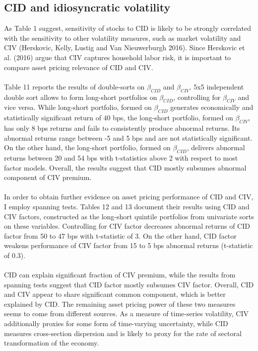 \documentclass[12pt]{article}
\begin{document}
\subsection{CID and idiosyncratic volatility}
As Table 1 suggest, sensitivity of stocks to CID is likely to be strongly correlated with the sensitivity to other volatility measures, such as market volatility and CIV (Herskovic, Kelly, Lustig and Van Nieuwerburgh 2016). Since Herskovic et al. (2016) argue that CIV captures household labor risk, it is important to compare asset pricing relevance of CID and CIV. 
\paragraph{}
Table 11 reports the results of double-sorts on $\beta_{CID}$ and $\beta_{CIV}$. 5x5 independent double sort allows to form long-short portfolios on $\beta_{CID}$, controlling for $\beta_{CIV}$ and vice versa. While long-short portfolio, formed on $\beta_{CID}$ generates economically and statistically significant return of 40 bps, the long-short portfolio, formed on $\beta_{CIV}$, has only 8 bps returns and fails to consistently produce abnormal returns. Its abnormal returns range between -5 and 5 bps and are not statistically significant. On the other hand, the long-short portfolio, formed on $\beta_{CID}$, delivers abnormal returns between 20 and 54 bps with t-statistics above 2 with respect to most factor models. Overall, the results suggest that CID mostly subsumes abnormal component of CIV premium.
\paragraph{}
In order to obtain further evidence on asset pricing performance of CID and CIV, I employ spanning tests. Tables 12 and 13 document their results using CID and CIV factors, constructed as the long-short quintile portfolios from univariate sorts on these variables. Controlling for CIV factor decreases abnormal returns of CID factor from 50 to 47 bps with t-statistic of 3. On the other hand, CID factor weakens performance of CIV factor from 15 to 5 bps abnormal returns (t-statistic of 0.3). 

\paragraph{}
CID can explain significant fraction of CIV premium, while the results from spanning tests suggest that CID factor mostly subsumes CIV factor. Overall, CID and CIV appear to share significant common component, which is better explained by CID. The remaining asset pricing power of these two measures seems to come from different sources. As a measure of time-series volatility, CIV additionally proxies for some form of time-varying uncertainty, while CID measures cross-section dispersion and is likely to proxy for the rate of sectoral transformation of the economy.
\end{document}
